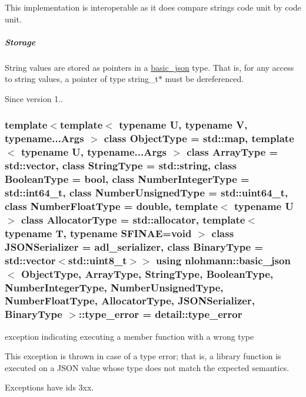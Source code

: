 This implementation is interoperable as it does compare strings code unit by code unit.

\subparagraph*{Storage}

String values are stored as pointers in a \hyperlink{classnlohmann_1_1basic__json}{basic\+\_\+json} type. That is, for any access to string values, a pointer of type {\ttfamily string\+\_\+t$\ast$} must be dereferenced.

\begin{DoxySince}{Since}
version 1.. 
\end{DoxySince}
\subsubsection[{\texorpdfstring{type\+\_\+error}{type_error}}]{\setlength{\rightskip}{0pt plus 5cm}template$<$template$<$ typename U, typename V, typename...\+Args $>$ class Object\+Type = std\+::map, template$<$ typename U, typename...\+Args $>$ class Array\+Type = std\+::vector, class String\+Type  = std\+::string, class Boolean\+Type  = bool, class Number\+Integer\+Type  = std\+::int64\+\_\+t, class Number\+Unsigned\+Type  = std\+::uint64\+\_\+t, class Number\+Float\+Type  = double, template$<$ typename U $>$ class Allocator\+Type = std\+::allocator, template$<$ typename T, typename S\+F\+I\+N\+A\+E=void $>$ class J\+S\+O\+N\+Serializer = adl\+\_\+serializer, class Binary\+Type  = std\+::vector$<$std\+::uint8\+\_\+t$>$$>$ using {\bf nlohmann\+::basic\+\_\+json}$<$ Object\+Type, Array\+Type, String\+Type, Boolean\+Type, Number\+Integer\+Type, Number\+Unsigned\+Type, Number\+Float\+Type, Allocator\+Type, J\+S\+O\+N\+Serializer, Binary\+Type $>$\+::{\bf type\+\_\+error} =  {\bf detail\+::type\+\_\+error}}\hypertarget{classnlohmann_1_1basic__json_ace5bf851eafe85bd6332f978991bc11c}{}\label{classnlohmann_1_1basic__json_ace5bf851eafe85bd6332f978991bc11c}


exception indicating executing a member function with a wrong type 

This exception is thrown in case of a type error; that is, a library function is executed on a J\+S\+ON value whose type does not match the expected semantics.

Exceptions have ids 3xx.

